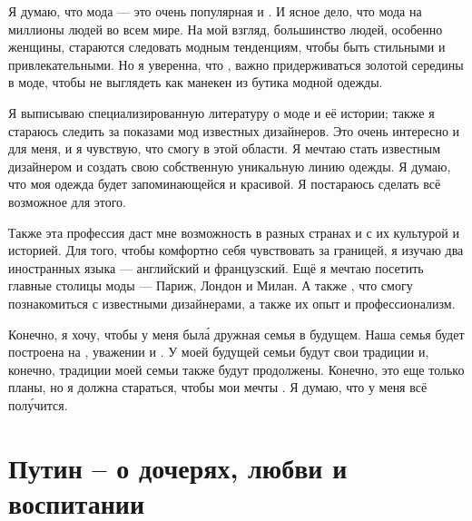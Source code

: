 Я думаю, что мода --- это очень популярная и  . И ясное дело, что мода  на миллионы людей во всем мире. На мой взгляд, большинство людей, особенно женщины, стараются следовать модным тенденциям, чтобы быть стильными и привлекательными. Но я уверенна, что , важно придерживаться золотой середины в моде, чтобы не выглядеть как манекен из бутика модной одежды.

Я выписываю специализированную литературу о моде и её истории; также я стараюсь следить за показами мод известных дизайнеров. Это очень интересно и  для меня, и я чувствую, что смогу  в этой области. Я мечтаю стать известным дизайнером и создать свою собственную уникальную линию одежды. Я думаю, что моя одежда будет запоминающейся и красивой. Я постараюсь сделать всё возможное для этого.

Также эта профессия даст мне возможность  в разных странах и  с их культурой и историей. Для того, чтобы комфортно себя чувствовать за границей, я изучаю два иностранных языка --- английский и французский. Ещё я мечтаю посетить главные столицы моды --- Париж, Лондон и Милан. А также , что смогу познакомиться с известными дизайнерами, а также  их опыт и профессионализм.

Конечно, я хочу, чтобы у меня был\'{а} дружная семья в будущем. Наша семья будет построена на , уважении и . У моей будущей семьи будут свои традиции и, конечно, традиции моей семьи также будут продолжены.
Конечно, это еще только планы, но я должна стараться, чтобы мои мечты . Я думаю, что у меня всё пол\'{у}чится.

\section{Путин -- о дочерях, любви и воспитании}


